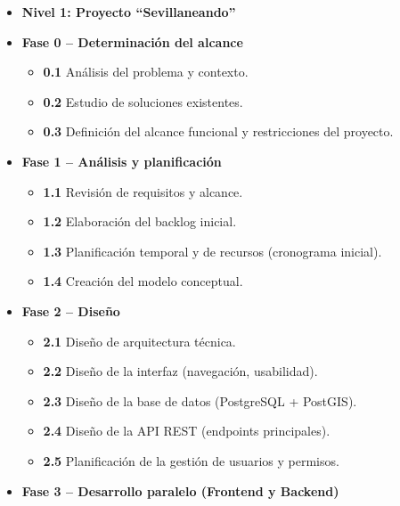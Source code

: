 \begin{itemize}
    \item \textbf{Nivel 1: Proyecto ``Sevillaneando''}

    \item \textbf{Fase 0 -- Determinación del alcance}
    \begin{itemize}
        \item \textbf{0.1} Análisis del problema y contexto.
        \item \textbf{0.2} Estudio de soluciones existentes.
        \item \textbf{0.3} Definición del alcance funcional y restricciones del proyecto.
    \end{itemize}

    \item \textbf{Fase 1 -- Análisis y planificación}
    \begin{itemize}
        \item \textbf{1.1} Revisión de requisitos y alcance.
        \item \textbf{1.2} Elaboración del backlog inicial.
        \item \textbf{1.3} Planificación temporal y de recursos (cronograma inicial).
        \item \textbf{1.4} Creación del modelo conceptual.
    \end{itemize}

    \item \textbf{Fase 2 -- Diseño}
    \begin{itemize}
        \item \textbf{2.1} Diseño de arquitectura técnica.
        \item \textbf{2.2} Diseño de la interfaz (navegación, usabilidad).
        \item \textbf{2.3} Diseño de la base de datos (PostgreSQL + PostGIS).
        \item \textbf{2.4} Diseño de la API REST (endpoints principales).
        \item \textbf{2.5} Planificación de la gestión de usuarios y permisos.
    \end{itemize}

    \item \textbf{Fase 3 -- Desarrollo paralelo (Frontend y Backend)}


\end{itemize}
